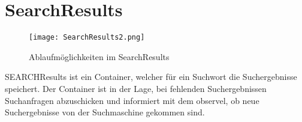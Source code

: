 
\section{SearchResults}
\begin{figure}[htb]
  \centering
  \texttt{[image: SearchResults2.png]}
  \caption{Ablaufmöglichkeiten im SearchResults}
	\label{fig:Ablaufmöglichkeiten im SearchResults}
\end{figure}

SEARCHResults ist ein Container, welcher für ein Suchwort die Suchergebnisse speichert.
Der Container ist in der Lage, bei fehlenden Suchergebnissen Suchanfragen abzuschicken und informiert mit dem observel, ob neue Suchergebnisse von der Suchmaschine gekommen sind.
